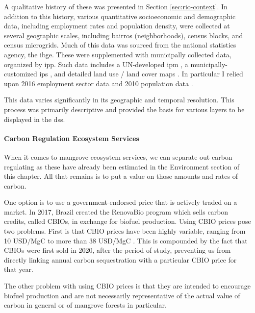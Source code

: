 A qualitative history of these was presented in Section \ref{sec:rio-context}. In addition to this history, various quantitative socioeconomic and demographic data, including employment rates and population density, were collected at several geographic scales, including bairros (neighborhoods), census blocks, and census microgrids. Much of this data was sourced from the national statistics agency, the \ac{ibge}. These were supplemented with municipally collected data, organized by \ac{ipp}. Such data includes a UN-developed \ac{ipm} \cite{oxfordpovertyandhumandevelopmentinitiativeChartingPathewaysOut2020}, a municipally-customized \ac{ips} \cite{puliciRelatorioMetodologicoIndice2016}, and detailed land use / land cover maps \cite{regoAutomaticClassificationLand2003}. In particular I relied upon 2016 employment sector data \cite{institutopereirapassosNumeroEmpregadosPor2018} and 2010 population data \cite{institutopereirapassosPopulacaoResidentePor2018}.

This data varies significantly in its geographic and temporal resolution. This process was primarily descriptive and provided the basis for various layers to be displayed in the \ac{dss}.

\paragraph{Carbon Regulation Ecosystem Services} \leavevmode\newline

When it comes to mangrove ecosystem services, we can separate out carbon regulating as these have already been estimated in the Environment section of this chapter. All that remains is to put a value on those amounts and rates of carbon.

One option is to use a government-endorsed price that is actively traded on a market. In 2017, Brazil created the RenovaBio program which sells carbon credits, called CBIOs, in exchange for biofuel production. Using CBIO prices pose two problems. First is that CBIO prices have been highly variable, ranging from 10 USD/MgC \cite{castroBrazilianCarbonCredit2020} to more than 38 USD/MgC \cite{barrosBiofuelsAnnual2022}. This is compounded by the fact that CBIOs were first sold in 2020, after the period of study, preventing us from directly linking annual carbon sequestration with a particular CBIO price for that year.

The other problem with using CBIO prices is that they are intended to encourage biofuel production and are not necessarily representative of the actual value of carbon in general or of mangrove forests in particular.   

